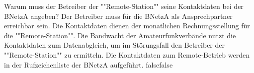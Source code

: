     {Warum muss der Betreiber der ""Remote-Station"" seine Kontaktdaten bei der BNetzA angeben?}
    {Der Betreiber muss für die BNetzA als Ansprechpartner erreichbar sein.}
    {Die Kontaktdaten dienen der monatlichen Rechnungsstellung für die ""Remote-Station"".}
    {Die Bandwacht der Amateurfunkverbände nutzt die Kontaktdaten zum Datenabgleich, um im Störungsfall den Betreiber der ""Remote-Station"" zu ermitteln.}
    {Die Kontaktdaten zum Remote-Betrieb werden in der Rufzeichenliste der BNetzA aufgeführt.}
    {false}{false}